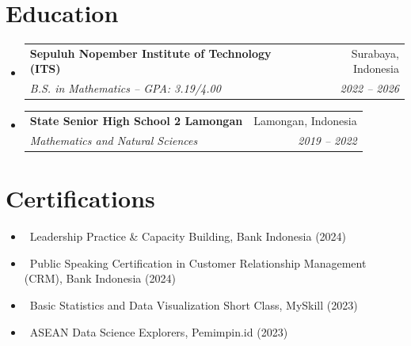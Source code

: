 \documentclass[letterpaper,10pt]{article}
\makeatletter
\newcommand{\resumeItem}[1]{\item\small{#1}}
\newcommand{\resumeSubheading}[4]{
\vspace{-1pt}\item
  \begin{tabular*}{0.97\textwidth}[t]{l@{\extracolsep{\fill}}r}
    \textbf{#1} & #2 \\
    \textit{#3} & \textit{#4} \\
  \end{tabular*}\vspace{-7pt}
}
\newcommand{\resumeSubHeadingList}{\begin{itemize}[leftmargin=0.15in, label={}]}
\newcommand{\resumeSubHeadingListEnd}{\end{itemize}}
\makeatother
\begin{document}
\section{Education}
\resumeSubHeadingList
  \resumeSubheading
      {Sepuluh Nopember Institute of Technology (ITS)}{Surabaya, Indonesia}
      {B.S. in Mathematics -- GPA: 3.19/4.00}{2022 -- 2026}
  \resumeSubheading
      {State Senior High School 2 Lamongan}{Lamongan, Indonesia}
      {Mathematics and Natural Sciences}{2019 -- 2022}
\resumeSubHeadingListEnd

\section{Certifications}
\resumeSubHeadingList
  \resumeItem{\textbullet\ Leadership Practice \& Capacity Building, Bank Indonesia (2024)}
  \resumeItem{\textbullet\ Public Speaking Certification in Customer Relationship Management (CRM), Bank Indonesia (2024)}
  \resumeItem{\textbullet\ Basic Statistics and Data Visualization Short Class, MySkill (2023)}
  \resumeItem{\textbullet\ ASEAN Data Science Explorers, Pemimpin.id (2023)}
\resumeSubHeadingListEnd
\end{document}
